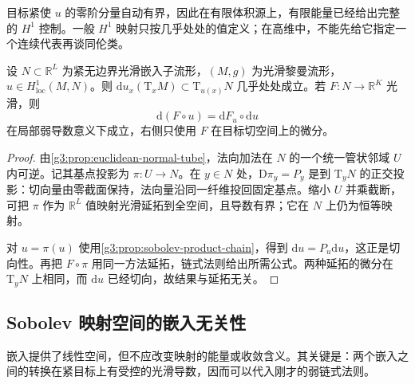 目标紧使 \(u\) 的零阶分量自动有界，因此在有限体积源上，有限能量已经给出完整的 \(H^1\) 控制。一般 \(H^1\) 映射只按几乎处处的值定义；在高维中，不能先给它指定一个连续代表再谈同伦类。

\begin{lemma}\label{g3:lem:sobolev-map-tangent}
	设 \(N\subset\mathbb R^L\) 为紧无边界光滑嵌入子流形，\((M,g)\) 为光滑黎曼流形，\(u\in H^1_{\mathrm{loc}}(M,N)\)。则 \(\mathrm du_x(\mathrm T_xM)\subset\mathrm T_{u(x)}N\) 几乎处处成立。若 \(F:N\to\mathbb R^K\) 光滑，则
	\[
		\mathrm d(F\circ u)=\mathrm dF_u\circ\mathrm du
	\]
	在局部弱导数意义下成立，右侧只使用 \(F\) 在目标切空间上的微分。
\end{lemma}
\begin{proof}
	由\cref{g3:prop:euclidean-normal-tube}，法向加法在 \(N\) 的一个统一管状邻域 \(U\) 内可逆。记其基点投影为 \(\pi:U\to N\)。在 \(y\in N\) 处，\(\mathrm D\pi_y=P_y\) 是到 \(\mathrm T_yN\) 的正交投影：切向量由零截面保持，法向量沿同一纤维投回固定基点。缩小 \(U\) 并乘截断，可把 \(\pi\) 作为 \(\mathbb R^L\) 值映射光滑延拓到全空间，且导数有界；它在 \(N\) 上仍为恒等映射。

	对 \(u=\pi(u)\) 使用\cref{g3:prop:sobolev-product-chain}，得到 \(\mathrm du=P_u\mathrm du\)，这正是切向性。再把 \(F\circ\pi\) 用同一方法延拓，链式法则给出所需公式。两种延拓的微分在 \(\mathrm T_yN\) 上相同，而 \(\mathrm du\) 已经切向，故结果与延拓无关。
\end{proof}

\subsection{Sobolev 映射空间的嵌入无关性}
\label{g3:subsec:1802:02}

嵌入提供了线性空间，但不应改变映射的能量或收敛含义。其关键是：两个嵌入之间的转换在紧目标上有受控的光滑导数，因而可以代入刚才的弱链式法则。

